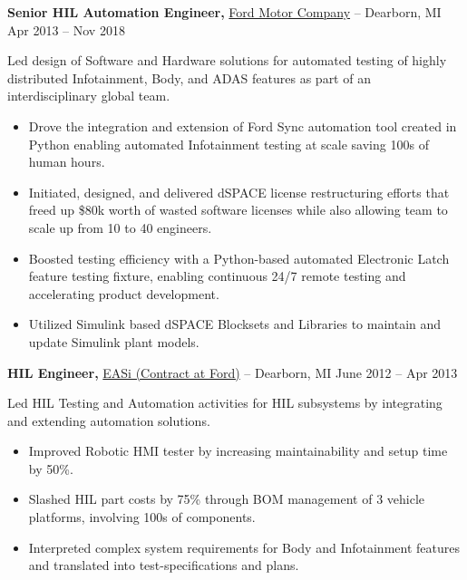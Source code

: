 \documentclass[11pt]{article}       %
\begin{document}
\textbf{Senior HIL Automation Engineer,} \href{}{Ford Motor Company} -- Dearborn, MI \hfill Apr 2013 -- Nov 2018 \\
\vspace{-9pt}
\begin{flushleft}
  Led design of Software and Hardware solutions for automated testing of highly distributed Infotainment, Body, and ADAS features as part of an interdisciplinary global team.
\end{flushleft}
\vspace{-21pt}

\begin{itemize}
  \item Drove the integration and extension of Ford Sync automation tool created in Python enabling automated Infotainment testing at scale saving 100s of human hours.
  \item Initiated, designed, and delivered dSPACE license restructuring efforts that freed up \$80k worth of wasted software licenses while also allowing team to scale up from 10 to 40 engineers.
  \item Boosted testing efficiency with a Python-based automated Electronic Latch feature testing fixture, enabling continuous 24/7 remote testing and accelerating product development.
  \item Utilized Simulink based dSPACE Blocksets and Libraries to maintain and update Simulink plant models. 
\end{itemize}

\textbf{HIL Engineer,} \href{}{EASi (Contract at Ford)} -- Dearborn, MI \hfill June 2012 -- Apr 2013 \\
\vspace{-9pt}
\begin{flushleft}
  Led HIL Testing and Automation activities for HIL subsystems by integrating and extending automation solutions.
\end{flushleft}
\vspace{-21pt}

\begin{itemize}
  \item Improved Robotic HMI tester by increasing maintainability and setup time by 50\%.
  \item Slashed HIL part costs by 75\% through BOM management of 3 vehicle platforms, involving 100s of components.
  \item Interpreted complex system requirements for Body and Infotainment features and translated into test-specifications and plans.
\end{itemize}
\end{document}
